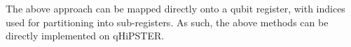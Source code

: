 The above approach can be mapped directly onto a qubit register, with indices used for partitioning into sub-registers. As such, the above methods can be directly implemented on qHiPSTER.


\fi
